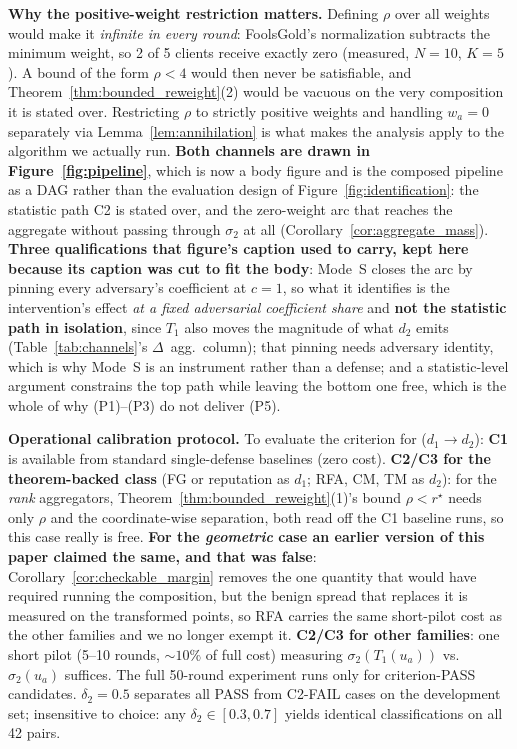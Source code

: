 \documentclass{article}
\begin{document}
\noindent\textbf{Why the positive-weight restriction matters.} Defining $\rho$ over all weights would make it \emph{infinite in every round}: FoolsGold's normalization subtracts the minimum weight, so 2 of 5 clients receive exactly zero (measured, $N{=}10$, $K{=}5$). A bound of the form $\rho < 4$ would then never be satisfiable, and Theorem~\ref{thm:bounded_reweight}(2) would be vacuous on the very composition it is stated over. Restricting $\rho$ to strictly positive weights and handling $w_a{=}0$ separately via Lemma~\ref{lem:annihilation} is what makes the analysis apply to the algorithm we actually run. \textbf{Both channels are drawn in Figure~\ref{fig:pipeline}}, which is now a body figure and is the composed pipeline as a DAG rather than the evaluation design of Figure~\ref{fig:identification}: the statistic path C2 is stated over, and the zero-weight arc that reaches the aggregate without passing through $\sigma_2$ at all (Corollary~\ref{cor:aggregate_mass}). \textbf{Three qualifications that figure's caption used to carry, kept here because its caption was cut to fit the body}: Mode~S closes the arc by pinning every adversary's coefficient at $c{=}1$, so what it identifies is the intervention's effect \emph{at a fixed adversarial coefficient share} and \textbf{not the statistic path in isolation}, since $T_1$ also moves the magnitude of what $d_2$ emits (Table~\ref{tab:channels}'s $\Delta$~agg.\ column); that pinning needs adversary identity, which is why Mode~S is an instrument rather than a defense; and a statistic-level argument constrains the top path while leaving the bottom one free, which is the whole of why (P1)--(P3) do not deliver (P5).

\noindent\textbf{Operational calibration protocol.} To evaluate the criterion for ($d_1{\to}d_2$): \textbf{C1} is available from standard single-defense baselines (zero cost). \textbf{C2/C3 for the theorem-backed class} (FG or reputation as $d_1$; RFA, CM, TM as $d_2$): for the \emph{rank} aggregators, Theorem~\ref{thm:bounded_reweight}(1)'s bound $\rho < r^\star$ needs only $\rho$ and the coordinate-wise separation, both read off the C1 baseline runs, so this case really is free. \textbf{For the \emph{geometric} case an earlier version of this paper claimed the same, and that was false}: Corollary~\ref{cor:checkable_margin} removes the one quantity that would have required running the composition, but the benign spread that replaces it is measured on the transformed points, so RFA carries the same short-pilot cost as the other families and we no longer exempt it. \textbf{C2/C3 for other families}: one short pilot (5--10 rounds, ${\sim}10\%$ of full cost) measuring $\sigma_2(T_1(u_a))$ vs.\ $\sigma_2(u_a)$ suffices. The full 50-round experiment runs only for criterion-PASS candidates. $\delta_2 = 0.5$ separates all PASS from C2-FAIL cases on the development set; insensitive to choice: any $\delta_2 \in [0.3, 0.7]$ yields identical classifications on all 42 pairs.
\end{document}

